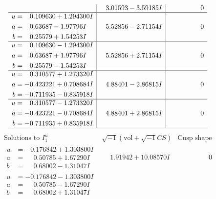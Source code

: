\documentclass[1p]{elsarticle_modified}
\theoremstyle{definition}
\newcommand{\I}{\sqrt{-1}}
\begin{document}
$$\begin{array}{c|c|c}
 & \phantom{-}3.01593 - 3.59185 I & \phantom{-0.000000 } 0 \\ \hline\begin{aligned}
u &= \phantom{-}0.109630 + 1.294300 I \\
a &= \phantom{-}0.63687 - 1.97796 I \\
b &= \phantom{-}0.25579 + 1.54253 I\end{aligned}
 & \phantom{-}5.52856 - 2.71154 I & \phantom{-0.000000 } 0 \\ \hline\begin{aligned}
u &= \phantom{-}0.109630 - 1.294300 I \\
a &= \phantom{-}0.63687 + 1.97796 I \\
b &= \phantom{-}0.25579 - 1.54253 I\end{aligned}
 & \phantom{-}5.52856 + 2.71154 I & \phantom{-0.000000 } 0 \\ \hline\begin{aligned}
u &= \phantom{-}0.310577 + 1.273320 I \\
a &= -0.423221 + 0.708684 I \\
b &= -0.711935 - 0.835918 I\end{aligned}
 & \phantom{-}4.88401 - 2.86815 I & \phantom{-0.000000 } 0 \\ \hline\begin{aligned}
u &= \phantom{-}0.310577 - 1.273320 I \\
a &= -0.423221 - 0.708684 I \\
b &= -0.711935 + 0.835918 I\end{aligned}
 & \phantom{-}4.88401 + 2.86815 I & \phantom{-0.000000 } 0\\
 \hline 
 \end{array}$$\newpage$$\begin{array}{c|c|c}  
\text{Solutions to }I^u_{1}& \I (\text{vol} + \sqrt{-1}CS) & \text{Cusp shape}\\
 \hline 
\begin{aligned}
u &= -0.176842 + 1.303800 I \\
a &= \phantom{-}0.50785 + 1.67290 I \\
b &= \phantom{-}0.68002 - 1.31047 I\end{aligned}
 & \phantom{-}1.91942 + 10.08570 I & \phantom{-0.000000 } 0 \\ \hline\begin{aligned}
u &= -0.176842 - 1.303800 I \\
a &= \phantom{-}0.50785 - 1.67290 I \\
b &= \phantom{-}0.68002 + 1.31047 I\end{aligned}

\end{array}$$
\end{document}
